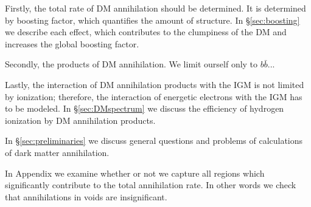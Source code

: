 Firstly, the total rate of DM annihilation should be determined. It is determined by boosting factor, which quantifies the amount of structure. In \S\ref{sec:boosting} we describe each effect, which contributes to the clumpiness of the DM and increases the global boosting factor.

Secondly, the products of DM annihilation. We limit ourself only to $b\bar{b}$...

Lastly, the interaction of DM annihilation products with the IGM is not limited by ionization; therefore, the interaction of energetic electrons with the IGM has to be modeled. In \S\ref{sec:DMspectrum} we discuss the efficiency of hydrogen ionization by DM annihilation products.

In \S\ref{sec:preliminaries} we discuss general questions and problems of calculations of dark matter annihilation.


In Appendix we examine whether or not we capture all regions which significantly contribute to the total annihilation rate. In other words we check that annihilations in voids are insignificant.

